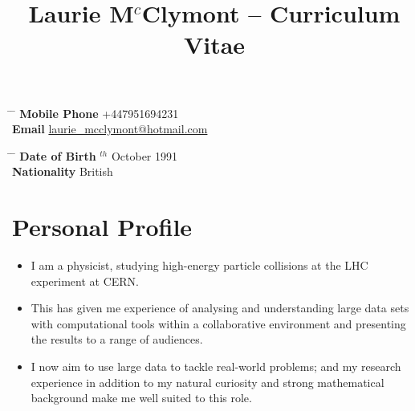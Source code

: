 \documentclass[10pt]{article} %
\begin{document}

\title{Laurie M$^{c}$Clymont -- Curriculum Vitae} %
\vspace{-5mm}


\parbox{0.5\textwidth}{ %
\begin{tabbing} %
\hspace{3cm} \= \hspace{4cm} \= \kill %
{\bf Mobile Phone} \> +447951694231 \\ %
{\bf Email} \> \href{mailto:laurie_mcclymont@hotmail.com}{laurie\_mcclymont@hotmail.com} \\ %
\end{tabbing}}
\hspace{2cm} %
\parbox{0.5\textwidth}{ %
\begin{tabbing} %
\hspace{3cm} \= \hspace{4cm} \= \kill %
{\bf Date of Birth} $^{th}$ October 1991 \\ %
{\bf Nationality} \> British \\ %
\end{tabbing}}


\vspace{-9mm}
\section{Personal Profile}
\begin{itemize}
\item{I am a physicist, studying high-energy particle collisions at the LHC experiment at CERN.}
\item{This has given me experience of analysing and understanding large data sets with computational tools within
  a collaborative environment and presenting the results to a range of audiences.}
\item{I now aim to use large data to tackle real-world problems; and my research experience in addition to my natural curiosity
  and strong mathematical %
  background make me well suited to this role.}
\end{itemize}
\end{document}
